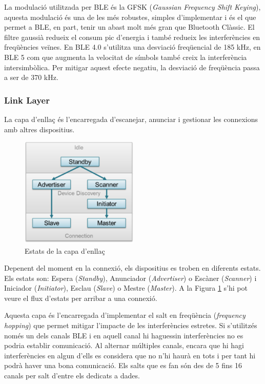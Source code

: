 La modulació utilitzada per BLE és la GFSK (\textit{Gaussian Frequency Shift Keying}), aquesta modulació és una de les més robustes, simples d'implementar i és el que permet a BLE, en part, tenir un abast molt més gran que Bluetooth Clàssic.
El filtre gaussià redueix el consum pic d'energia \cite{BLE_Review} i també redueix les interferències en freqüències veïnes.
En BLE 4.0 s'utilitza una desviació freqüencial de 185 kHz, en BLE 5 com que augmenta la velocitat de símbols també creix la interferència intersimbòlica.
Per mitigar aquest efecte negatiu, la desviació de freqüència passa a ser de 370 kHz.


\subsubsection{Link Layer}
La capa d'enllaç és l'encarregada d'escanejar, anunciar i gestionar les connexions amb altres dispositius.

\begin{figure}[!h]
	\begin{center}
		\includegraphics[width=0.5\textwidth]{./images/gap_state_diagram.png}
		\caption{Estats de la capa d'enllaç \cite{Link_Layer_states}}
		\label{Link_State_Diagram}
	\end{center}
\end{figure}

Depenent del moment en la connexió, els dispositius es troben en diferents estats.
Els estats son: Espera (\textit{Standby}), Anunciador (\textit{Advertiser}) o Escàner (\textit{Scanner}) i Iniciador (\textit{Initiator}), Esclau (\textit{Slave}) o Mestre (\textit{Master}).
A la Figura \ref{Link_State_Diagram} s'hi pot veure el flux d'estats per arribar a una connexió.

Aquesta capa és l'encarregada d'implementar el salt en freqüència (\textit{frequency hopping}) que permet mitigar l'impacte de les interferències estretes.
Si s'utilitzés només un dels canals BLE i en aquell canal hi haguessin interferències no es podria establir comunicació.
Al alternar múltiples canals, encara que hi hagi interferències en algun d'ells es considera que no n'hi haurà en tots i per tant hi podrà haver una bona comunicació.
Els salts que es fan són des de 5 fins 16 canals per salt d'entre els dedicats a dades.

